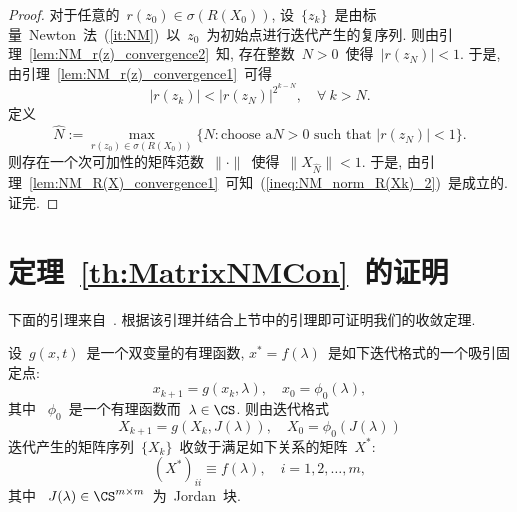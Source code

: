 \begin{proof}

对于任意的~$r(z_0) \in \sigma(R(X_0))$,
设~$\{z_k\}$~是由标量~Newton~法~(\ref{it:NM})~以~$z_0$~为初始点进行迭代产生的复序列.
则由引理~\ref{lem:NM_r(z)_convergence2}~知, 存在整数~$N
> 0$~使得~$|r(z_N)| < 1$. 于是,
由引理~\ref{lem:NM_r(z)_convergence1}~可得
\begin{equation*}
\label{ineq:abs_r(zk)_3} |r(z_k)| < |r(z_N)|^{2^{k-N}}, \quad
\forall \ k > N.
\end{equation*}
定义
$$
\widehat{N} := \max_{r(z_0) \in \sigma(R(X_0))} \{N: \text{choose a
}N
> 0 \text{ such that } |r(z_N)| < 1\}.
$$
%
则存在一个次可加性的矩阵范数~$\|\cdot\|$~使得~$\|X_{\widehat{N}}\| <
1$. 于是,
由引理~\ref{lem:NM_R(X)_convergence1}~可知~(\ref{ineq:NM_norm_R(Xk)_2})~是成立的.
证完.
\end{proof}



\section{定理~\ref{th:MatrixNMCon}~的证明}



下面的引理来自~\cite[定理~4.15]{Higham2008}.
根据该引理并结合上节中的引理即可证明我们的收敛定理.

\begin{lemma}
\label{lem:MatIteConLem} %

设~$g(x,t)$~是一个双变量的有理函数, $x^* =
f(\lambda)$~是如下迭代格式的一个吸引固定点:
$$
x_{k + 1} = g(x_k, \lambda), \quad x_0 = \phi_0(\lambda),
$$
其中 ~$\phi_0$~是一个有理函数而~$\lambda \in \CS$. 则由迭代格式
$$
X_{k + 1} = g(X_k, J(\lambda)), \quad X_0 = \phi_0(J(\lambda))
$$
迭代产生的矩阵序列~$\{X_k\}$~收敛于满足如下关系的矩阵~$X^*$:
$$
(X^*)_{ii} \equiv f(\lambda), \quad i = 1, 2, \ldots, m,
$$
其中 ~$J(\lambda) \in \CS^{m \times m}$~为~Jordan~块.
\end{lemma}




